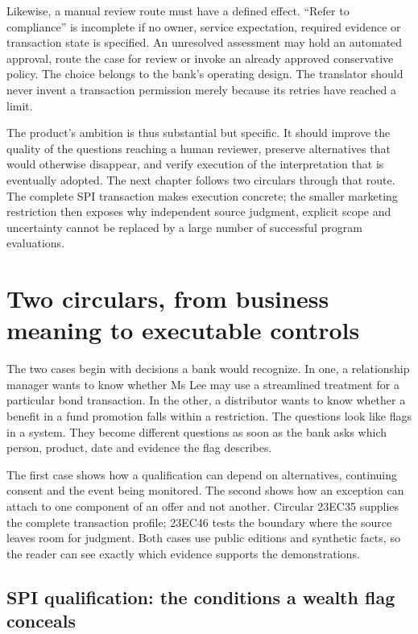 \documentclass[12pt,a4paper,oneside,openany]{book}
\begin{document}
Likewise, a manual review route must have a defined effect. ``Refer to compliance''
is incomplete if no owner, service expectation, required evidence or transaction
state is specified. An unresolved assessment may hold an automated approval,
route the case for review or invoke an already approved conservative policy. The
choice belongs to the bank's operating design. The translator should never
invent a transaction permission merely because its retries have reached a limit.

The product's ambition is thus substantial but specific. It should improve the
quality of the questions reaching a human reviewer, preserve alternatives that
would otherwise disappear, and verify execution of the interpretation that is
eventually adopted. The next chapter follows two circulars through that route. The complete
SPI transaction makes execution concrete; the smaller marketing restriction
then exposes why independent source judgment, explicit scope and uncertainty
cannot be replaced by a large number of successful program evaluations.

\chapter{Two circulars, from business meaning to executable controls}
\label{ch:circular}

The two cases begin with decisions a bank would recognize. In one, a relationship
manager wants to know whether Ms Lee may use a streamlined treatment for a
particular bond transaction. In the other, a distributor wants to know whether
a benefit in a fund promotion falls within a restriction. The questions look
like flags in a system. They become different questions as soon as the bank asks
which person, product, date and evidence the flag describes.

The first case shows how a qualification can depend on alternatives, continuing
consent and the event being monitored. The second shows how an exception can
attach to one component of an offer and not another. Circular 23EC35 supplies
the complete transaction profile; 23EC46 tests the boundary where the source
leaves room for judgment. Both cases use public editions and synthetic facts, so
the reader can see exactly which evidence supports the demonstrations.

\section{SPI qualification: the conditions a wealth flag conceals}
\label{merge:P-01-problem:02}
\end{document}
